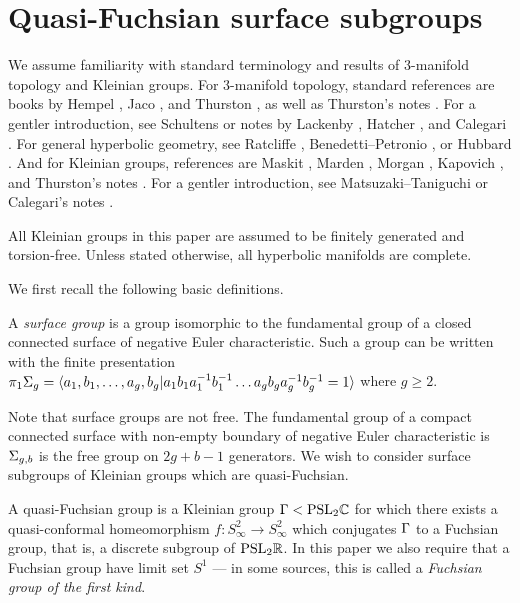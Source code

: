 \section{Quasi-Fuchsian surface subgroups}

We assume familiarity with standard terminology and results of $3$-manifold
topology and Kleinian groups.  For $3$-manifold topology, standard references
are books by Hempel \cite{He}, Jaco \cite{Ja}, and Thurston
\cite{Thurstonbook}, as well as Thurston's notes \cite{Thurstonnotes}.  For
a gentler introduction, see Schultens \cite{Sch} or notes by Lackenby
\cite{Lackenbynotes}, Hatcher \cite{Hatchernotes}, and Calegari
\cite{Calegarinotes2}. For general hyperbolic geometry, see Ratcliffe
\cite{Ratcliffe}, Benedetti--Petronio \cite{BenedettiPetronio}, or Hubbard
\cite{Hubbard}.  And for Kleinian groups, references are Maskit \cite{Maskit},
Marden \cite{Marden}, Morgan \cite{Mo}, Kapovich \cite{Kapovich}, and
Thurston's notes \cite{Thurstonnotes}.  For a gentler introduction, see
Matsuzaki--Taniguchi \cite{MatsuzakiTaniguchi} or Calegari's notes
\cite{Calegarinotes}.

All Kleinian groups in this paper are assumed to be finitely generated and
torsion-free. Unless stated otherwise, all hyperbolic manifolds are complete.

We first recall the following basic definitions.

\begin{defn}

A \emph{surface group} is a group isomorphic to the fundamental group of
a closed connected surface of negative Euler characteristic. Such a group can
be written with the finite presentation
%
$\pi_1 \Sigma_g = \langle a_1,b_1,\dots,a_g,b_g | a_1b_1a_1^{-1}b_1^{-1} \dots
a_gb_ga_g^{-1}b_g^{-1} = 1\rangle$
%
where $g \geq 2$.

\end{defn}

Note that surface groups are not free. The fundamental group of a compact
connected surface with non-empty boundary of negative Euler characteristic is
$\Sigma_{g,b}$ is the free group on $2g + b - 1$ generators. We wish to consider
surface subgroups of Kleinian groups which are quasi-Fuchsian.

\begin{defn}

A {quasi-Fuchsian group} is a Kleinian group $\Gamma < \mathrm{PSL}_2\mathbb{C}$ for which there
exists a quasi-conformal homeomorphism $f \colon S^2_\infty \to S^2_\infty$
which conjugates $\Gamma$ to a Fuchsian group, that is, a discrete subgroup of
$\mathrm{PSL}_2\mathbb{R}$. In this paper we also require that a Fuchsian group have limit set
$S^1$ --- in some sources, this is called a \emph{Fuchsian group of the first
kind}.

\end{defn}

